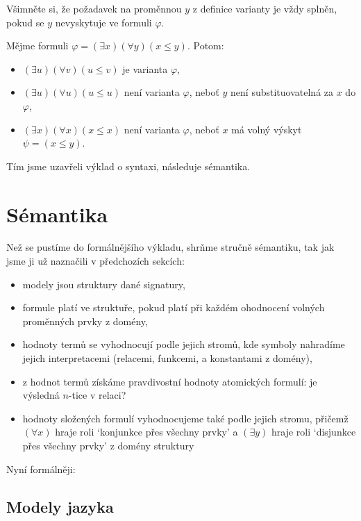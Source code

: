 Všimněte si, že požadavek na proměnnou $y$ z definice varianty je vždy splněn, pokud se $y$ nevyskytuje ve formuli $\varphi$.

\begin{example}
    Mějme formuli $\varphi=(\exists x)(\forall y)(x\leq y)$. Potom:
\begin{itemize}
    \item $(\exists u)(\forall v)(u\leq v)$ je varianta $\varphi$,
    \item $(\exists u)(\forall u)(u\leq u)$ není varianta $\varphi$, neboť $y$ není substituovatelná za $x$ do $\varphi$,
    \item $(\exists x)(\forall x)(x\leq x)$ není varianta $\varphi$, neboť $x$ má volný výskyt $\psi=(x\leq y)$.
\end{itemize}   
\end{example}

Tím jsme uzavřeli výklad o syntaxi, následuje sémantika.


\section{Sémantika}\label{section:predicate-semantics}

Než se pustíme do formálnějšího výkladu, shrňme stručně sémantiku, tak jak jsme ji už naznačili v předchozích sekcích: 

\begin{itemize}
    \item modely jsou struktury dané signatury,
    \item formule platí ve struktuře, pokud platí při každém ohodnocení volných proměnných prvky z domény,
    \item hodnoty termů se vyhodnocují podle jejich stromů, kde symboly nahradíme jejich interpretacemi (relacemi, funkcemi, a konstantami z domény),
    \item z hodnot termů získáme pravdivostní hodnoty atomických formulí: je výsledná $n$-tice v relaci?
    \item hodnoty složených formulí vyhodnocujeme také podle jejich stromu, přičemž $(\forall x)$ hraje roli `konjunkce přes všechny prvky' a  $(\exists y)$ hraje roli `disjunkce přes všechny prvky' z domény struktury
\end{itemize}

Nyní formálněji:

\subsection{Modely jazyka}

